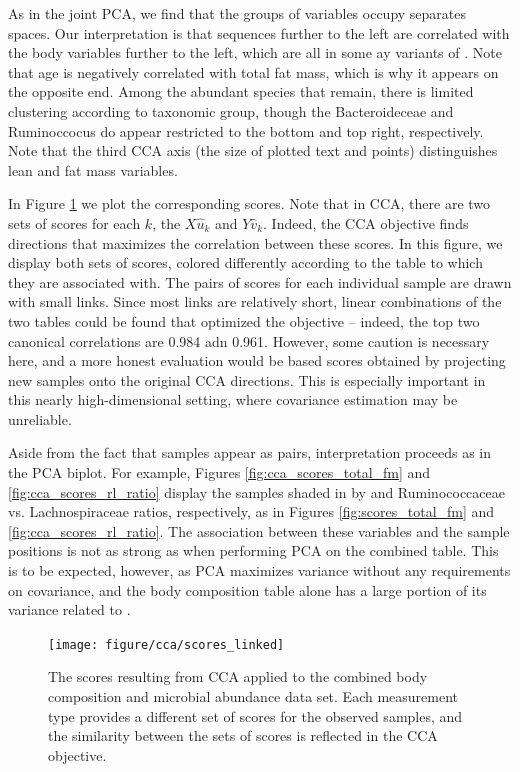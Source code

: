 \documentclass{article}
\begin{document}
As in the joint PCA, we find that the groups of variables occupy separates
spaces. Our interpretation is that sequences further to the left are correlated
with the body variables further to the left, which are all in some ay variants
of . Note that age is negatively correlated with total fat mass, which is why it
appears on the opposite end. Among the abundant species that remain, there is
limited clustering according to taxonomic group, though the Bacteroideceae and
Ruminoccocus do appear restricted to the bottom and top right, respectively.
Note that the third CCA axis (the size of plotted text and points) distinguishes
lean and fat mass variables.

In Figure \ref{fig:cca_scores_linked} we plot the corresponding scores. Note
that in CCA, there are two sets of scores for each $k$, the $X\hat{u}_{k}$ and
$Y\hat{v}_{k}$. Indeed, the CCA objective finds directions that maximizes the
correlation between these scores. In this figure, we display both sets of
scores, colored differently according to the table to which they are associated
with. The pairs of scores for each individual sample are drawn with small links.
Since most links are relatively short, linear combinations of the two tables
could be found that optimized the objective -- indeed, the top two canonical
correlations are 0.984 adn 0.961. However, some caution is necessary here, and a
more honest evaluation would be based scores obtained by projecting new samples
onto the original CCA directions. This is especially important in this nearly
high-dimensional setting, where covariance estimation may be unreliable.

Aside from the fact that samples appear as pairs, interpretation proceeds as in
the PCA biplot. For example, Figures \ref{fig:cca_scores_total_fm} and
\ref{fig:cca_scores_rl_ratio} display the samples shaded in by  and
Ruminococcaceae vs. Lachnospiraceae ratios, respectively, as in Figures
\ref{fig:scores_total_fm} and \ref{fig:cca_scores_rl_ratio}. The association
between these variables and the sample positions is not as strong as when
performing PCA on the combined table. This is to be expected, however, as PCA
maximizes variance without any requirements on covariance, and the body
composition table alone has a large portion of its variance related to .

\begin{figure}[ht]
  \centering
  \texttt{[image: figure/cca/scores\_linked]}
  \caption{The scores resulting from CCA applied to the combined body
    composition and microbial abundance data set. Each measurement type provides
    a different set of scores for the observed samples, and the similarity
    between the sets of scores is reflected in the CCA
    objective.\label{fig:cca_scores_linked}}
\end{figure}
\end{document}
